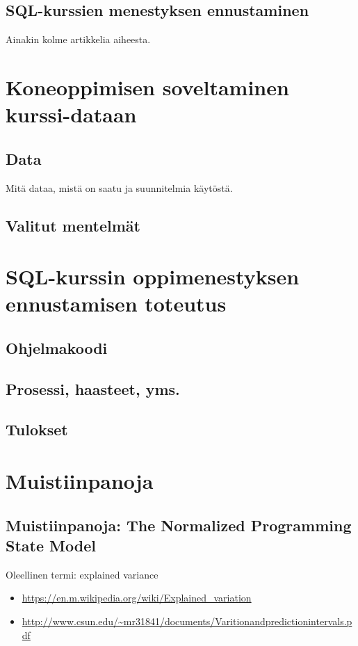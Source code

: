 \documentclass[finnish,twoside,openright]{HYgraduMLDS}
\begin{document}
\section{SQL-kurssien menestyksen ennustaminen}

Ainakin kolme artikkelia aiheesta.


\chapter{Koneoppimisen soveltaminen kurssi-dataan}

\section{Data}

Mitä dataa, mistä on saatu ja suunnitelmia käytöstä.


\section{Valitut mentelmät}


\chapter{SQL-kurssin oppimenestyksen ennustamisen toteutus}

\section{Ohjelmakoodi}


\section{Prosessi, haasteet, yms.}


\section{Tulokset}

\chapter{Muistiinpanoja}

\section{Muistiinpanoja: The Normalized Programming State Model}

Oleellinen termi: explained variance
\begin{itemize}
    \item \url{https://en.m.wikipedia.org/wiki/Explained\_variation}
    \item \url{http://www.csun.edu/~mr31841/documents/Varitionandpredictionintervals.pdf}
\end{itemize}
\end{document}
